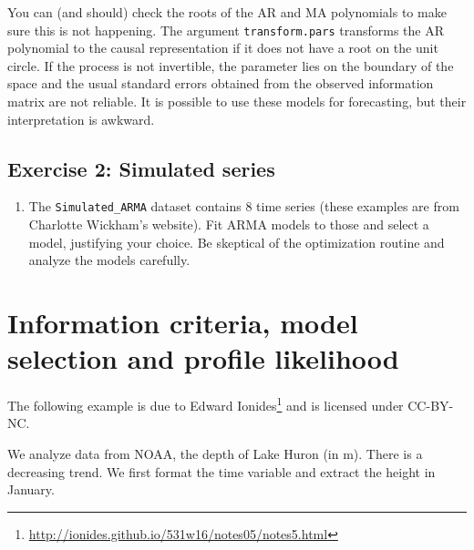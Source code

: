 \documentclass[]{book}
\providecommand{\tightlist}{%
  \setlength{\itemsep}{0pt}\setlength{\parskip}{0pt}}
\let\rmarkdownfootnote\footnote%
\def\footnote{\protect\rmarkdownfootnote}
\renewcommand{\href}[2]{#2\footnote{\url{#1}}}
\begin{document}
You can (and should) check the roots of the AR and MA polynomials to make sure this is not happening. The argument \texttt{transform.pars} transforms the AR polynomial to the causal representation if it does not have a root on the unit circle. If the process is not invertible, the parameter lies on the boundary of the space and the usual standard errors obtained from the observed information matrix are not reliable. It is possible to use these models for forecasting, but their interpretation is awkward.

\hypertarget{exercise-2-simulated-series}{%
\subsection{Exercise 2: Simulated series}\label{exercise-2-simulated-series}}

\begin{enumerate}
\def\labelenumi{\arabic{enumi}.}
\tightlist
\item
  The \texttt{Simulated\_ARMA} dataset contains 8 time series (these examples are from Charlotte Wickham's website). Fit ARMA models to those and select a model, justifying your choice. Be skeptical of the optimization routine and analyze the models carefully.
\end{enumerate}

\hypertarget{information-criteria-model-selection-and-profile-likelihood}{%
\section{Information criteria, model selection and profile likelihood}\label{information-criteria-model-selection-and-profile-likelihood}}

The following example is due to \href{http://ionides.github.io/531w16/notes05/notes5.html}{Edward Ionides} and is licensed under CC-BY-NC.

We analyze data from NOAA, the depth of Lake Huron (in m). There is a decreasing trend. We first format the time variable and extract the height in January.
\end{document}
